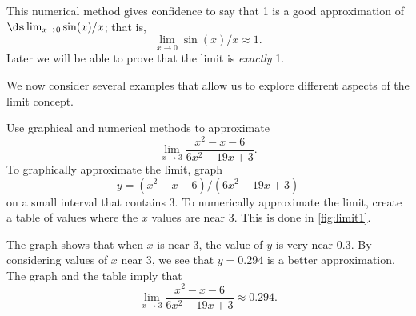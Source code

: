 This numerical method gives confidence to say that 1 is a good approximation of $\ds\lim_{x\to 0} \sin(x)/x$; that is,\vspace{-.3\baselineskip}
\[\lim_{x\to 0} \sin(x)/x \approx 1.\]
Later we will be able to prove that the limit is \emph{exactly} 1.


We now consider several examples that allow us to explore different aspects of the limit concept.

\begin{example}\label{ex_limit1}
Use graphical and numerical methods to approximate
\[\lim_{x\to 3} \frac{x^2-x-6}{6x^2-19x+3}.\]
\solution
To graphically approximate the limit, graph
\[y = (x^2-x-6)/(6x^2-19x+3)\]
on a small interval that contains 3. To numerically approximate the limit, create a table of values where the $x$ values are near 3. This is done in \autoref{fig:limit1}.


The graph shows that when $x$ is near 3, the value of $y$ is very near $0.3$. By considering values of $x$ near 3, we see that $y=0.294$ is a better approximation. The graph and the table imply that
\[\lim_{x\to 3} \frac{x^2-x-6}{6x^2-19x+3} \approx 0.294.\]
\end{example}

